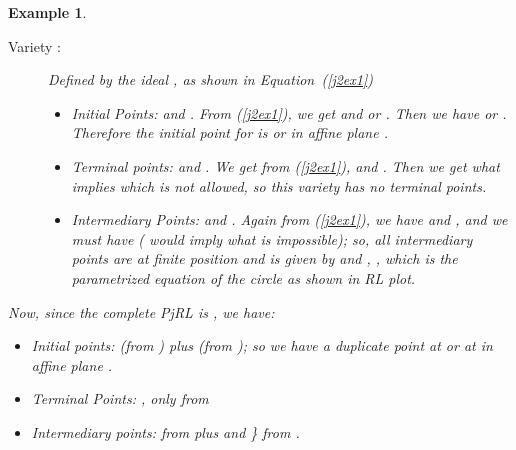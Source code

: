 \documentclass{article}
\newtheorem{example}{Example}[section]
\begin{document}
\begin{example}
\begin{description}
\begin{itemize}
\end{itemize}

\item[Variety :] Defined by the ideal , as shown in Equation~(\ref{j2ex1})
\begin{itemize}
\item Initial Points:  and . From (\ref{j2ex1}), we get  and  or . Then we 
have 
or . Therefore the initial point for  is  or  in affine plane .
\item Terminal points:  and . We get from (\ref{j2ex1}),  and . Then we get 
 what
implies  which is not allowed, so this variety has no terminal points.
\item Intermediary Points:  and . Again from (\ref{j2ex1}), we have  and 
,
and we must have  ( would imply  what is impossible); so, all intermediary points are at finite 
position and is given by
 and , , which is the parametrized equation of the circle as 
shown in RL plot.

\end{itemize}

\end{description}

Now, since the complete PjRL is , we have:
\begin{itemize}
\item Initial points:  (from ) plus  (from ); so we have a duplicate 
point at 
 or at  in affine plane .
\item Terminal Points: , only from 
\item Intermediary points:  from 
 plus 
 and \} from .


\end{itemize}

\end{example}
\end{document}
